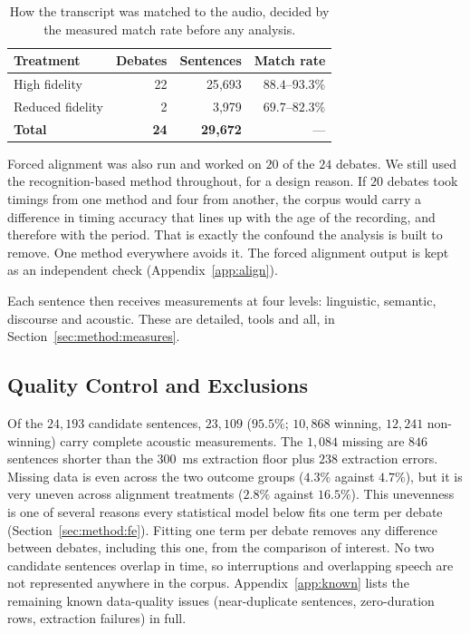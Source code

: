 \documentclass[pdflatex,sn-mathphys-num]{sn-jnl}%
\begin{document}
\begin{table}[t]
\caption{How the transcript was matched to the audio, decided by the measured
match rate before any analysis.}
\label{tab:align}
\centering
\begin{tabular}{lrrr}
\toprule
Treatment & Debates & Sentences & Match rate \\
\midrule
High fidelity     & 22 & 25{,}693 & $88.4$--$93.3\%$ \\
Reduced fidelity  & 2  & 3{,}979  & $69.7$--$82.3\%$ \\
\midrule
\textbf{Total}    & \textbf{24} & \textbf{29{,}672} & --- \\
\bottomrule
\end{tabular}
\end{table}

Forced alignment was also run and worked on $20$ of the $24$ debates. We still
used the recognition-based method throughout, for a design reason. If $20$
debates took timings from one method and four from another, the corpus would
carry a difference in timing accuracy that lines up with the age of the
recording, and therefore with the period. That is exactly the confound the
analysis is built to remove. One method everywhere avoids it. The forced alignment
output is kept as an independent check (Appendix~\ref{app:align}).

Each sentence then receives measurements at four levels: linguistic,
semantic, discourse and acoustic. These are detailed, tools and all, in
Section~\ref{sec:method:measures}.

\subsection{Quality Control and Exclusions}
\label{sec:data:quality}

Of the $24{,}193$ candidate sentences, $23{,}109$ ($95.5\%$; $10{,}868$
winning, $12{,}241$ non-winning) carry complete acoustic measurements. The
$1{,}084$ missing are $846$ sentences shorter than the $300$~ms extraction
floor plus $238$ extraction errors. Missing data is even across the two
outcome groups ($4.3\%$ against $4.7\%$), but it is very uneven across
alignment treatments ($2.8\%$ against $16.5\%$). This unevenness is one of
several reasons every statistical model below fits one term per debate
(Section~\ref{sec:method:fe}). Fitting one term per debate removes any
difference between debates, including this one, from the comparison of
interest. No two candidate sentences overlap in time, so
interruptions and overlapping speech are not represented anywhere in the
corpus. Appendix~\ref{app:known} lists the remaining known data-quality
issues (near-duplicate sentences, zero-duration rows, extraction failures) in
full.
\end{document}

